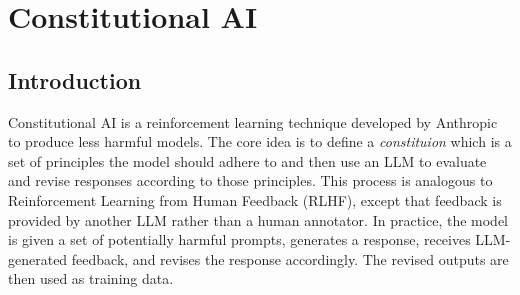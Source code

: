 \documentclass[twoside]{report}
\begin{document}
\chapter{Constitutional AI}
\section{Introduction}
Constitutional AI is a reinforcement learning technique developed by Anthropic to produce less harmful models. \cite{bai2022constitutional} The core idea is to define a \emph{constituion} which is a set of principles the model should adhere to and then use an LLM to evaluate and revise responses according to those principles. This process is analogous to Reinforcement Learning from Human Feedback (RLHF), except that feedback is provided by another LLM rather than a human annotator. In practice, the model is given a set of potentially harmful prompts, generates a response, receives LLM-generated feedback, and revises the response accordingly. The revised outputs are then used as training data.
\end{document}
